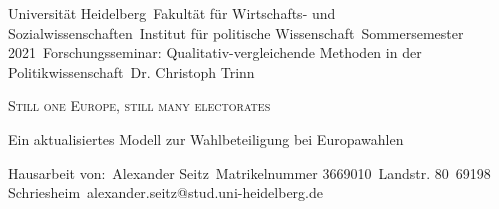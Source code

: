 \thispagestyle{empty}
\setcounter{page}{0}
\noindent
Universität Heidelberg\
Fakultät für Wirtschafts- und Sozialwissenschaften\
Institut für politische Wissenschaft\
Sommersemester 2021\
Forschungsseminar: Qualitativ-vergleichende Methoden in der Politikwissenschaft\
Dr. Christoph Trinn\
\begin{center}
\vspace*{6cm}
\huge\textsc{Still one Europe, still many electorates}\

\LARGE{Ein aktualisiertes Modell zur Wahlbeteiligung bei Europawahlen}\
\vspace*{6cm}
\end{center}
\noindent
Hausarbeit von:\
Alexander Seitz\
Matrikelnummer 3669010\
Landstr. 80\
69198 Schriesheim\
alexander.seitz@stud.uni-heidelberg.de\
\newpage

